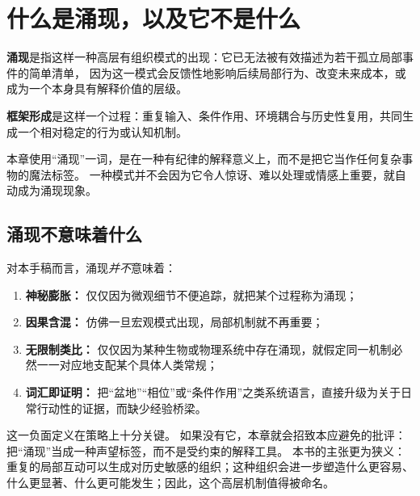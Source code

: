 \section{什么是涌现，以及它不是什么}

\begin{definition}[涌现]
\textbf{涌现}是指这样一种高层有组织模式的出现：它已无法被有效描述为若干孤立局部事件的简单清单，
因为这一模式会反馈性地影响后续局部行为、改变未来成本，或成为一个本身具有解释价值的层级。
\end{definition}

\begin{definition}[框架形成]
\textbf{框架形成}是这样一个过程：重复输入、条件作用、环境耦合与历史性复用，共同生成一个相对稳定的行为或认知机制。
\end{definition}

\begin{remark}
本章使用“涌现”一词，是在一种有纪律的解释意义上，而不是把它当作任何复杂事物的魔法标签。
一种模式并不会因为它令人惊讶、难以处理或情感上重要，就自动成为涌现现象。
\end{remark}

\subsection{涌现不意味着什么}

对本手稿而言，涌现\emph{并不}意味着：
\begin{enumerate}[nosep]
  \item \textbf{神秘膨胀：} 仅仅因为微观细节不便追踪，就把某个过程称为涌现；
  \item \textbf{因果含混：} 仿佛一旦宏观模式出现，局部机制就不再重要；
  \item \textbf{无限制类比：} 仅仅因为某种生物或物理系统中存在涌现，就假定同一机制必然一一对应地支配某个具体人类常规；
  \item \textbf{词汇即证明：} 把“盆地”“相位”或“条件作用”之类系统语言，直接升级为关于日常行动性的证据，而缺少经验桥梁。
\end{enumerate}

\begin{discussion}
这一负面定义在策略上十分关键。
如果没有它，本章就会招致本应避免的批评：把“涌现”当成一种声望标签，而不是受约束的解释工具。
本书的主张更为狭义：重复的局部互动可以生成对历史敏感的组织；这种组织会进一步塑造什么更容易、什么更显著、什么更可能发生；因此，这个高层机制值得被命名。
\end{discussion}